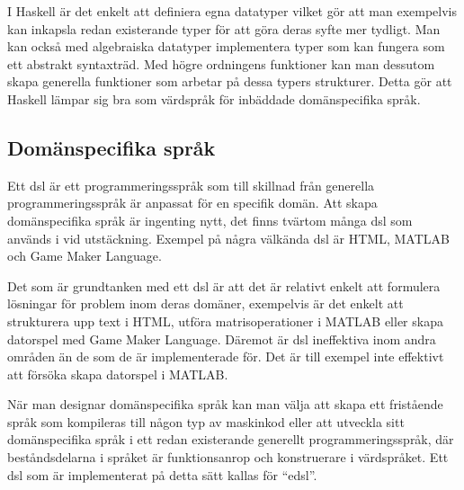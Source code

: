 \documentclass[12pt,a4paper,twoside,openright]{article}
\begin{document}
I Haskell är det enkelt att definiera egna datatyper vilket gör att
man exempelvis kan inkapsla redan existerande typer för att göra deras
syfte mer tydligt. Man kan också med algebraiska datatyper
implementera typer som kan fungera som ett abstrakt syntaxträd. Med
högre ordningens funktioner kan man dessutom skapa generella
funktioner som arbetar på dessa typers strukturer. Detta gör att
Haskell lämpar sig bra som värdspråk för inbäddade domänspecifika
språk.

\subsection{Domänspecifika språk}
Ett \gls{dsl} är ett programmeringsspråk som till skillnad från
generella programmeringsspråk är anpassat för en specifik domän. Att
skapa domän\-specifika språk är ingenting nytt, det finns tvärtom
många \gls{dsl} som används i vid utstäckning. Exempel på några välkända \gls{dsl}
är HTML, MATLAB och Game Maker Language.

Det som är grundtanken med ett \gls{dsl} är att det är relativt enkelt att
formulera lösningar för problem inom deras domäner, exempelvis är det
enkelt att strukturera upp text i HTML, utföra matrisoperationer i
MATLAB eller skapa datorspel med Game Maker Language. Däremot är \gls{dsl}
ineffektiva inom andra områden än de som de är implementerade för.
Det är till exempel inte effektivt att försöka skapa datorspel i
MATLAB.

När man designar domänspecifika språk kan man välja att skapa ett
fristående språk som kompileras till någon typ av maskinkod eller att
utveckla sitt domänspecifika språk i ett redan existerande generellt
programmeringsspråk, där beståndsdelarna i språket är funktionsanrop
och konstruerare i värdspråket. Ett \gls{dsl} som är implementerat på detta
sätt kallas för ``\gls{edsl}''.
\end{document}
